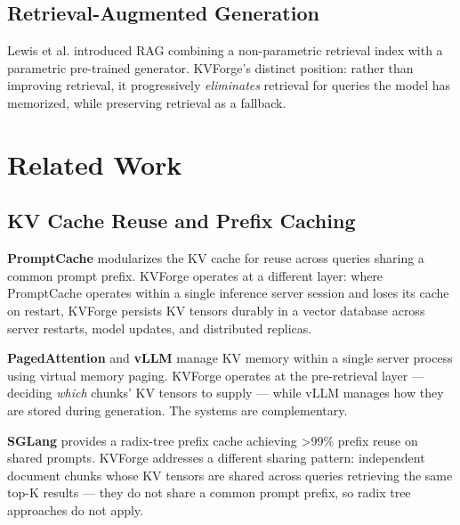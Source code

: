 \documentclass[10pt,twocolumn]{article}
\begin{document}
\subsection{Retrieval-Augmented Generation}

Lewis et al. \cite{ref1} introduced RAG combining a non-parametric retrieval index with a parametric pre-trained generator. KVForge's distinct position: rather than improving retrieval, it progressively \textit{eliminates} retrieval for queries the model has memorized, while preserving retrieval as a fallback.



\smallskip

\section{Related Work}

\subsection{KV Cache Reuse and Prefix Caching}

\textbf{PromptCache} \cite{ref6} modularizes the KV cache for reuse across queries sharing a common prompt prefix. KVForge operates at a different layer: where PromptCache operates within a single inference server session and loses its cache on restart, KVForge persists KV tensors durably in a vector database across server restarts, model updates, and distributed replicas.


\textbf{PagedAttention} \cite{ref3} and \textbf{vLLM} manage KV memory within a single server process using virtual memory paging. KVForge operates at the pre-retrieval layer --- deciding \textit{which} chunks' KV tensors to supply --- while vLLM manages how they are stored during generation. The systems are complementary.


\textbf{SGLang} \cite{ref7} provides a radix-tree prefix cache achieving >99\% prefix reuse on shared prompts. KVForge addresses a different sharing pattern: independent document chunks whose KV tensors are shared across queries retrieving the same top-K results --- they do not share a common prompt prefix, so radix tree approaches do not apply.
\end{document}
